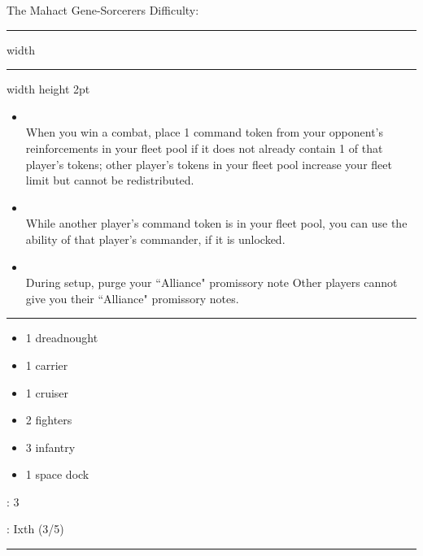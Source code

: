 {\handel\Huge The Mahact Gene-Sorcerers} \hfill {\Large Difficulty: \hard} \vspace{-4pt}\\
\hrule width \hsize \kern 1mm \hrule width \hsize height 2pt


\begin{multicols}{2}


\begin{itemize}
\item {}\\
When you win a combat, place 1 command token from your opponent's reinforcements in your fleet pool if it does not already contain 1 of that player's tokens; other player's tokens in your fleet pool increase your fleet limit but cannot be redistributed.
\item {}\\
While another player's command token is in your fleet pool, you can use the ability of that player's commander, if it is unlocked.
\item {}\\
During setup, purge your ``Alliance" promissory note Other players cannot give you their ``Alliance" promissory notes.
\end{itemize}


\vspace{-10pt}\rule{\hsize}{0.4pt}\vspace{5pt}


\vspace{-5pt}
\begin{multicols}{2}
\begin{itemize}
\item 1 dreadnought
\item 1 carrier
\item 1 cruiser
\item 2 fighters
\item 3 infantry
\item 1 space dock
\end{itemize}
\end{multicols}

\vspace{-5pt}
: 3

\vspace{2pt}
: Ixth (3/5)

\rule{\hsize}{0.4pt}\vspace{5pt}


\end{multicols}
